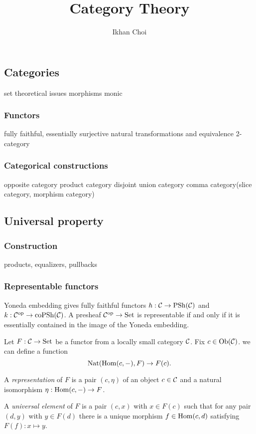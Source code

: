 \documentclass{../../large}
\begin{document}
\title{Category Theory}
\author{Ikhan Choi}
\maketitle
\tableofcontents


\part{}

\chapter{Categories}
set theoretical issues
morphisms
	monic

\section{Functors}
fully faithful, essentially surjective
natural transformations and equivalence
2-category


\section{Categorical constructions}
opposite category
product category
disjoint union category
comma category(slice category, morphism category)



\chapter{Universal property}

\section{Construction}
products, equalizers, pullbacks

\section{Representable functors}

Yoneda embedding gives fully faithful functors $h:\mathcal{C}\to\mathrm{PSh}(\mathcal{C})$ and $k:\mathcal{C}^{\mathrm{op}}\to\mathrm{coPSh}(\mathcal{C})$.
A presheaf $\mathcal{C}^{\mathrm{op}}\to\mathrm{Set}$ is representable if and only if it is essentially contained in the image of the Yoneda embedding.

\begin{prb}
Let $F:\mathcal{C}\to\mathrm{Set}$ be a functor from a locally small category $\mathcal{C}$.
Fix $c\in\operatorname{Ob}(\mathcal{C})$.
 we can define a function
\[\operatorname{Nat}(\operatorname{Hom}(c,-),F)\to F(c).\]

A \emph{representation} of $F$ is a pair $(c,\eta)$ of an object $c\in\mathcal{C}$ and a natural isomorphism $\eta:\operatorname{Hom}(c,-)\to F$.

A \emph{universal element} of $F$ is a pair $(c,x)$ with $x\in F(c)$ such that for any pair $(d,y)$ with $y\in F(d)$ there is a unique morphism $f\in\operatorname{Hom}(c,d)$ satisfying $F(f):x\mapsto y$.

\begin{parts}
\item
\end{parts}
\end{prb}
\end{document}

